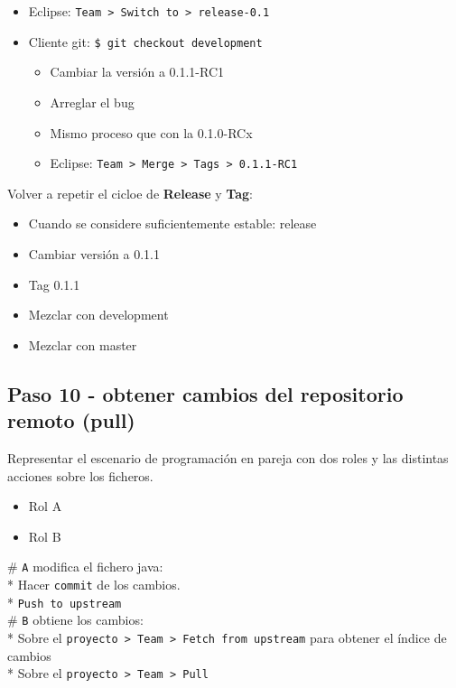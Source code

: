 \begin{itemize}
\item
  Eclipse:
  \texttt{Team \textgreater{} Switch to \textgreater{} release-0.1}
\item
  Cliente git: \texttt{\$ git checkout development}
  \begin{itemize}
  \item
    Cambiar la versión a 0.1.1-RC1
  \item
    Arreglar el bug
  \item
    Mismo proceso que con la 0.1.0-RCx
  \item
    Eclipse:
    \texttt{Team \textgreater{} Merge \textgreater{} Tags \textgreater{} 0.1.1-RC1}
  \end{itemize}
\end{itemize}
Volver a repetir el cicloe de \textbf{Release} y \textbf{Tag}:

\begin{itemize}
\item
  Cuando se considere suficientemente estable: release
\item
  Cambiar versión a 0.1.1
\item
  Tag 0.1.1
\item
  Mezclar con development
\item
  Mezclar con master
\end{itemize}
\subsection{Paso 10 - obtener cambios del repositorio remoto (pull)}

Representar el escenario de programación en pareja con dos roles y las
distintas acciones sobre los ficheros.

\begin{itemize}
\item
  Rol A
\item
  Rol B
\end{itemize}
\# \texttt{A} modifica el fichero java:\\* Hacer \texttt{commit} de los
cambios.\\* \texttt{Push to upstream}\\\# \texttt{B} obtiene los
cambios:\\* Sobre el
\texttt{proyecto \textgreater{} Team \textgreater{} Fetch from upstream}
para obtener el índice de cambios\\* Sobre el
\texttt{proyecto \textgreater{} Team \textgreater{} Pull}

